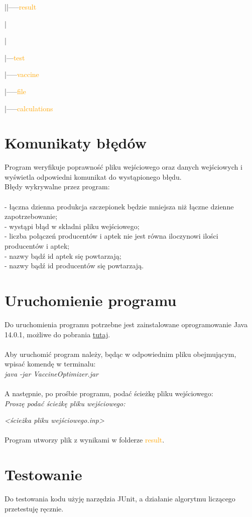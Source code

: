 \documentclass[]{article}
\begin{document}
	|\hspace{15mm}|-----\textcolor{orange}{result}
	
	|
	
	|
	
	|---\textcolor{orange}{test}
	
	\hspace{5mm} |-----\textcolor{orange}{vaccine} 

	\hspace{16mm}|-----\textcolor{orange}{file}
	
	\hspace{16mm}|-----\textcolor{orange}{calculations}

\clearpage

\section{Komunikaty błędów}
Program weryfikuje poprawność pliku wejściowego oraz danych wejściowych i wyświetla odpowiedni komunikat do wystąpionego błędu. \\ Błędy wykrywalne przez program:\\\\
- łączna dzienna produkcja szczepionek będzie mniejsza niż łączne dzienne zapotrzebowanie;\\
- wystąpi błąd w składni pliku wejściowego;\\
- liczba połączeń producentów i aptek nie jest równa iloczynowi ilości producentów i aptek;\\
- nazwy bądź id aptek się powtarzają;\\
- nazwy bądź id producentów się powtarzają.\\

\section{Uruchomienie programu}
Do uruchomienia programu potrzebne jest zainstalowane oprogramowanie Java 14.0.1, możliwe do pobrania \href{https://jdk.java.net/archive/}{tutaj}.\\\\
Aby uruchomić program należy, będąc w odpowiednim pliku obejmującym, wpisać komendę w terminalu:\\

\textit{java -jar VaccineOptimizer.jar}\\\\
A następnie, po prośbie programu, podać ścieżkę pliku wejściowego:\\

\textit{Proszę podać ścieżkę pliku wejściowego: }

\textit{<ścieżka pliku wejściowego.inp>}\\\\
Program utworzy plik z wynikami w folderze \textcolor{orange}{result}.

\section{Testowanie}
Do testowania kodu użyję narzędzia JUnit, a działanie algorytmu liczącego przetestuję ręcznie.
\end{document}
